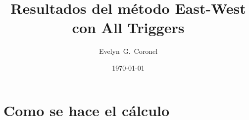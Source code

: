 



\title{Resultados del método East-West con All Triggers}
\author{Evelyn~G.~Coronel}


\date[]{\lowercase{\today}} %


\maketitle

\section*{Como se hace el cálculo}

